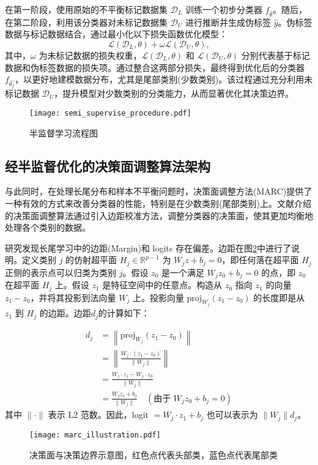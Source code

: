 \documentclass[master]{thesis-uestc}
\begin{document}
在第一阶段，使用原始的不平衡标记数据集 $\mathcal{D}_{L}$ 训练一个初步分类器 $f_{\hat{\theta}}$。随后，在第二阶段，利用该分类器对未标记数据集 $\mathcal{D}_{U}$ 进行推断并生成伪标签 $\hat{y}$。伪标签数据与标记数据结合，通过最小化以下损失函数优化模型：
\begin{equation} 
    \mathcal{L}(\mathcal{D}_{L},\theta) + \omega \mathcal{L}(\mathcal{D}_{U},\theta), 
    \label{eq:semi_loss}
\end{equation}
其中，$\omega$ 为未标记数据的损失权重，$\mathcal{L}(\mathcal{D}_{L},\theta)$ 和 $\mathcal{L}(\mathcal{D}_{U},\theta)$ 分别代表基于标记数据和伪标签数据的损失项。通过整合这两部分损失，最终得到优化后的分类器 $f_{\hat{\theta_f}}$，以更好地建模数据分布，尤其是尾部类别(少数类别)。该过程通过充分利用未标记数据 $\mathcal{D}_{U}$，提升模型对少数类别的分类能力，从而显著优化其决策边界。

\begin{figure}[h]
    \centering
    \texttt{[image: semi\_supervise\_procedure.pdf]}
    \caption{半监督学习流程图}
    \label{semi_supervise_procedure}
\end{figure}
\FloatBarrier  %
\subsection{经半监督优化的决策面调整算法架构}
与此同时，在处理长尾分布和样本不平衡问题时，决策面调整方法(MARC)提供了一种有效的方式来改善分类器的性能，特别是在少数类别(尾部类别)上。文献\cite{wang2023margin}介绍的决策面调整算法通过引入边距校准方法，调整分类器的决策面，使其更加均衡地处理各个类别的数据。

研究发现长尾学习中的边距(Margin)和 logits 存在偏差。边距在图\ref{marc_illustration}中进行了说明。定义类别 $ j $ 的仿射超平面 $ H_j \in \mathbb{R}^{p-1} $ 为 $ W_j z + b_j = 0 $，即任何落在超平面 $ H_j $ 正侧的表示点可以归类为类别 $ j $。假设 $ z_0 $ 是一个满足 $ W_j z_0 + b_j = 0 $ 的点，即 $ z_0 $ 在超平面 $ H_j $ 上。假设 $ z_1 $ 是特征空间中的任意点。构造从 $ z_0 $ 指向 $ z_1 $ 的向量 $ z_1 - z_0 $，并将其投影到法向量 $ W_j $ 上。投影向量 $ \text{proj}_{W_j}(z_1 - z_0) $ 的长度即是从 $ z_1 $ 到 $ H_j $ 的边距。边距$d_j$的计算如下：

\begin{equation}
    \begin{split}
        d_j &= \left\| \text{proj}_{W_j}(z_1 - z_0) \right\| \\
            &= \left\| \frac{W_j \cdot (z_1 - z_0)}{\|W_j\|} \right\| \\
            &= \frac{W_j \cdot z_1 - W_j \cdot z_0}{\|W_j\|} \\
            &= \frac{W_j z_1 + b_j}{\|W_j\|} \quad (\text{由于 } W_j z_0 + b_j = 0)
    \end{split}
\end{equation}
其中 $ \| \cdot \| $ 表示 L2 范数。因此，logit $= W_j \cdot z_1 + b_j $ 也可以表示为 $ \|W_j\| d_j $。
\begin{figure}[h]
    \centering
    \texttt{[image: marc\_illustration.pdf]}
    \caption{决策面与决策边界示意图，红色点代表头部类，蓝色点代表尾部类}
    \label{marc_illustration}
\end{figure}
\end{document}
